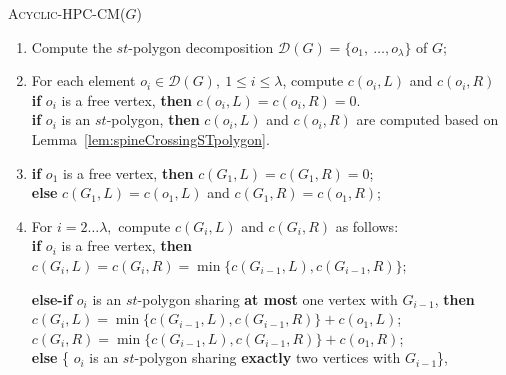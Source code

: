 \documentclass{myllncs-mixalis}
\begin{document}
\begin{algorithm2e}[tb]




\caption{\textsc{Acyclic-HPC-CM($G$)}}

\label{alg:AHPCCM}

\begin{enumerate}
\item
Compute the $st$-polygon decomposition $\mathcal{D}(G)= \{ o_1,~
\ldots, o_\lambda \}$ of $G$;\;
\item For each element $o_i \in \mathcal{D}(G),~ 1 \leq i \leq
\lambda$, compute $c(o_i,L)$ and $c(o_i,R)$\\
\hspace*{.7cm}\textbf{if} $o_i$ is a free vertex, \textbf{then}
$c(o_i,L)=c(o_i,R)=0$. \\
\hspace*{.7cm}\textbf{if} $o_i$ is an $st$-polygon, \textbf{then}
$c(o_i,L)$ and $c(o_i,R)$ are computed based on\\
\hspace*{1.4cm}Lemma~\ref{lem:spineCrossingSTpolygon}.\\

\item \textbf{if} $o_1$ is a free vertex, \textbf{then} $c(G_1,L)=c(G_1,R)=0$;\\
\textbf{else}  $c(G_1,L)= c(o_1,L)$ and $ c(G_1,R)=c(o_1,R)$;
\item
 For $i=2\ldots \lambda,$ compute $c(G_i,L)$ and $c(G_i,R)$ as
 follows:\\
\hspace*{.7cm}  \textbf{if} $o_i$ is a free vertex, \textbf{then}\\
     \hspace*{1.4cm} $c(G_i,L)=c(G_i,R)=\min\{ c(G_{i-1},L), c(G_{i-1},R) \}$;

\hspace*{.7cm}  \textbf{else-if} $o_i$ is an $st$-polygon sharing \textbf{at most} one vertex with $G_{i-1}$, \textbf{then}\\
     \hspace*{1.4cm} $c(G_i,L)=\min\{ c(G_{i-1},L), c(G_{i-1},R)\} + c(o_1,L) $;
     \hspace*{1.4cm} $c(G_i,R)=\min\{ c(G_{i-1},L), c(G_{i-1},R)\}  + c(o_1,R)
     $;\\
\hspace*{.7cm}  \textbf{else} \{ $o_i$ is an $st$-polygon sharing \textbf{exactly} two vertices with $G_{i-1}$\}, \\


\end{enumerate}
\end{algorithm2e}
\end{document}
